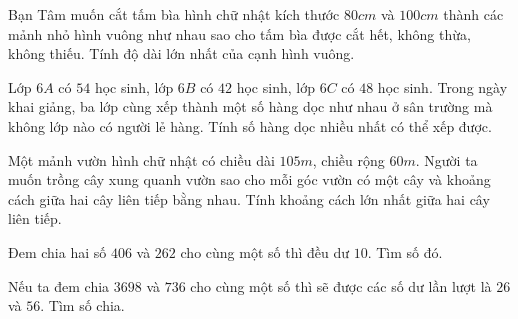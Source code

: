 \begin{bt}
Bạn Tâm muốn cắt tấm bìa hình chữ nhật kích thước $80cm$ và $100cm$ thành các mảnh nhỏ hình vuông như nhau sao cho tấm bìa được cắt hết, không thừa, không thiếu. Tính độ dài lớn nhất của cạnh hình vuông.
\end{bt}   \begin{bt}
Lớp $6A$ có $54$ học sinh, lớp $6B$ có $42$ học sinh, lớp $6C$ có $48$ học sinh. Trong ngày khai giảng, ba lớp cùng xếp thành một số hàng dọc như nhau ở sân trường  mà không lớp nào có người lẻ hàng. Tính số hàng dọc nhiều nhất có thể xếp được.
\end{bt}   \begin{bt}
Một mảnh vườn hình chữ nhật có chiều dài $105m$, chiều rộng $60m$. Người ta muốn trồng cây xung quanh vườn sao cho mỗi góc vườn có một cây và khoảng cách giữa hai cây liên tiếp bằng nhau. Tính khoảng cách lớn nhất giữa hai cây liên tiếp.
\end{bt}   \begin{bt}
Đem chia hai số $406$ và $262$ cho cùng một số thì đều dư $10$. Tìm số đó.
\end{bt}   \begin{bt}
Nếu ta đem chia $3698$ và $736$ cho cùng một số thì sẽ được các số dư lần lượt là $26$ và $56$. Tìm số chia.
\end{bt}